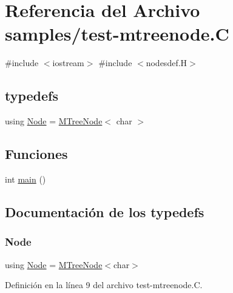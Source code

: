 \hypertarget{test-mtreenode_8_c}{}\section{Referencia del Archivo samples/test-\/mtreenode.C}
\label{test-mtreenode_8_c}
{\ttfamily \#include $<$iostream$>$}\newline
{\ttfamily \#include $<$nodesdef.\+H$>$}\newline
\subsection*{typedefs}
\begin{DoxyCompactItemize}
\item 
using \hyperlink{test-mtreenode_8_c_a17a24b0725f59987143c5faf63c4dc6f}{Node} = \hyperlink{class_designar_1_1_m_tree_node}{M\+Tree\+Node}$<$ char $>$
\end{DoxyCompactItemize}
\subsection*{Funciones}
\begin{DoxyCompactItemize}
\item 
int \hyperlink{test-mtreenode_8_c_ae66f6b31b5ad750f1fe042a706a4e3d4}{main} ()
\end{DoxyCompactItemize}


\subsection{Documentación de los \textquotesingle{}typedefs\textquotesingle{}}
\mbox{\label{test-mtreenode_8_c_a17a24b0725f59987143c5faf63c4dc6f}} 
\subsubsection{\texorpdfstring{Node}{Node}}
{\footnotesize\ttfamily using \hyperlink{namespace_designar_a5af326c65aa2bd26b26c410f2030d09e}{Node} =  \hyperlink{class_designar_1_1_m_tree_node}{M\+Tree\+Node}$<$char$>$}



Definición en la línea 9 del archivo test-\/mtreenode.\+C.




